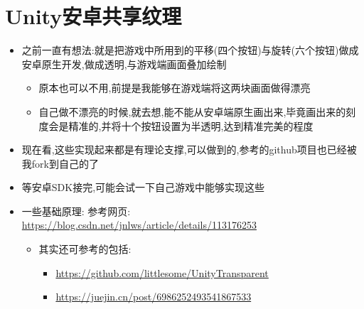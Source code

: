 \documentclass[9pt, b5paper]{article}
\begin{document}
\section{Unity安卓共享纹理}
\label{sec-2}
\begin{itemize}
\item 之前一直有想法:就是把游戏中所用到的平移(四个按钮)与旋转(六个按钮)做成安卓原生开发,做成透明,与游戏端画面叠加绘制
\begin{itemize}
\item 原本也可以不用,前提是我能够在游戏端将这两块画面做得漂亮
\item 自己做不漂亮的时候,就去想,能不能从安卓端原生画出来,毕竟画出来的刻度会是精准的,并将十个按钮设置为半透明,达到精准完美的程度
\end{itemize}
\item 现在看,这些实现起来都是有理论支撑,可以做到的,参考的github项目也已经被我fork到自己的了
\item 等安卓SDK接完,可能会试一下自己游戏中能够实现这些
\item 一些基础原理: 参考网页: \url{https://blog.csdn.net/jnlws/article/details/113176253}
\begin{itemize}
\item 其实还可参考的包括:
\begin{itemize}
\item \url{https://github.com/littlesome/UnityTransparent}
\item \url{https://juejin.cn/post/6986252493541867533}　
\end{itemize}
\end{itemize}
\end{itemize}
\end{document}
